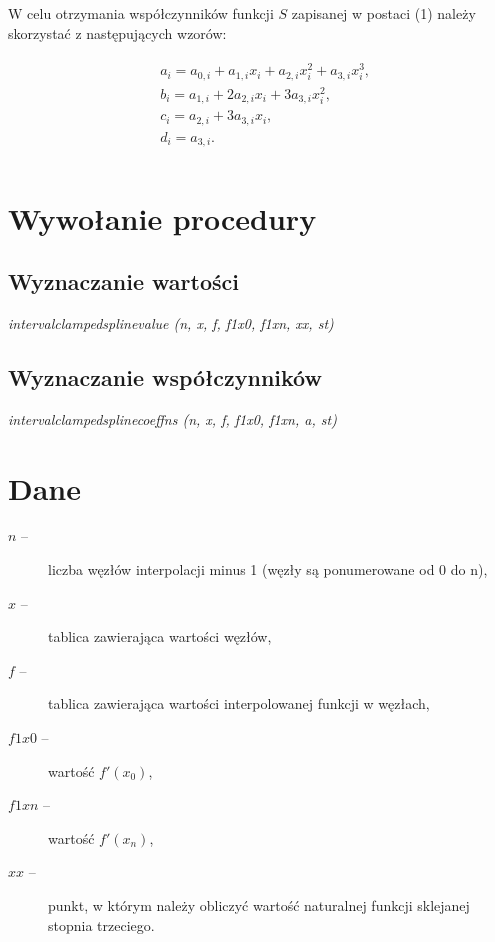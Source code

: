 \documentclass[a4paper, 10pt]{article}
\begin{document}
W celu otrzymania współczynników funkcji $S$ zapisanej w postaci (1) należy skorzystać z następujących wzorów:

\begin{align*}
\begin{split}
&a_i = a_{0,i} + a_{1,i}x_i + a_{2,i}x_i^2 + a_{3,i}x_i^3, \\
&b_i = a_{1,i} + 2a_{2,i}x_i + 3a_{3,i}x_i^2, \\
&c_i = a_{2,i} + 3a_{3,i}x_i, \\
&d_i = a_{3,i}. \\
\end{split}
\end{align*}
 
\section{Wywołanie procedury}

\subsection*{Wyznaczanie wartości}

\textit{intervalclampedsplinevalue (n, x, f, f1x0, f1xn, xx, st)}

\subsection*{Wyznaczanie współczynników}

\textit{intervalclampedsplinecoeffns (n, x, f, f1x0, f1xn, a, st)}

\section{Dane}

\begin{description}
\item[$n$ \enskip --] liczba węzłów interpolacji minus 1 (węzły są ponumerowane od 0 do n),
\item[$x$ \enskip --] tablica zawierająca wartości węzłów,
\item[$f$ \enskip --] tablica zawierająca wartości interpolowanej funkcji w węzłach,
\item[$f1x0$ \enskip --] wartość $f'(x_0)$,
\item[$f1xn$ \enskip --] wartość $f'(x_n)$,
\item[$xx$ \enskip --] punkt, w którym należy obliczyć wartość naturalnej funkcji sklejanej stopnia trzeciego.
\end{description}
\end{document}
